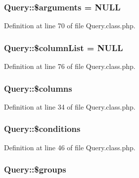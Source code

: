 \hypertarget{classQuery_a49166e3c5f5198e4b899c8ee47b6258a}{
\subsubsection[{\$arguments}]{\setlength{\rightskip}{0pt plus 5cm}Query\+::\$arguments = N\+U\+L\+L}}\label{classQuery_a49166e3c5f5198e4b899c8ee47b6258a}


Definition at line 70 of file Query.\+class.\+php.

\hypertarget{classQuery_a113bcdfdc3bf6acef684a06ae324334a}{
\subsubsection[{\$column\+List}]{\setlength{\rightskip}{0pt plus 5cm}Query\+::\$column\+List = N\+U\+L\+L}}\label{classQuery_a113bcdfdc3bf6acef684a06ae324334a}


Definition at line 76 of file Query.\+class.\+php.

\hypertarget{classQuery_a7cf97254cbd55fdbb9e149723498d9ba}{
\subsubsection[{\$columns}]{\setlength{\rightskip}{0pt plus 5cm}Query\+::\$columns}}\label{classQuery_a7cf97254cbd55fdbb9e149723498d9ba}


Definition at line 34 of file Query.\+class.\+php.

\hypertarget{classQuery_a5c71d786a82b2cc014968d2553b6bc9d}{
\subsubsection[{\$conditions}]{\setlength{\rightskip}{0pt plus 5cm}Query\+::\$conditions}}\label{classQuery_a5c71d786a82b2cc014968d2553b6bc9d}


Definition at line 46 of file Query.\+class.\+php.

\hypertarget{classQuery_a76992fbfae6d700e65dfde28911a2475}{
\subsubsection[{\$groups}]{\setlength{\rightskip}{0pt plus 5cm}Query\+::\$groups}}\label{classQuery_a76992fbfae6d700e65dfde28911a2475}


